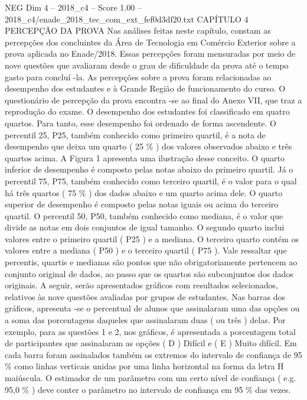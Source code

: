 \begin{textsample}{NEG Dim 4 – 2018\_c4 – Score 1.00 – 2018\_c4/enade\_2018\_tec\_com\_ext\_fef0d3df20.txt}  \label{ex:f4_neg_176}
CAPÍTULO 4 PERCEPÇÃO DA PROVA Nas análises feitas neste capítulo, constam as percepções dos concluintes da Área de Tecnologia em Comércio Exterior sobre a prova aplicada no Enade/2018.
Essas percepções foram mensuradas por meio de nove questões que avaliaram desde o grau de dificuldade da prova até o tempo gasto para concluí -la.
As percepções sobre a prova foram relacionadas ao desempenho dos estudantes e à Grande Região de funcionamento do curso.
O questionário de percepção da prova encontra -se ao final do Anexo VII, que traz a reprodução do exame.
O desempenho dos estudantes foi classificado em quatro quartos.
Para tanto, esse desempenho foi ordenado de forma ascendente.
O percentil 25, P25, também conhecido como primeiro quartil, é a nota de desempenho que deixa um quarto ( 25 \% ) dos valores observados abaixo e três quartos acima.
A Figura 1 apresenta uma ilustração desse conceito.
O quarto inferior de desempenho é composto pelas notas abaixo do primeiro quartil.
Já o percentil 75, P75, também conhecido como terceiro quartil, é o valor para o qual há três quartos ( 75 \% ) dos dados abaixo e um quarto acima dele.
O quarto superior de desempenho é composto pelas notas iguais ou acima do terceiro quartil.
O percentil 50, P50, também conhecido como mediana, é o valor que divide as notas em dois conjuntos de igual tamanho.
O segundo quarto inclui valores entre o primeiro quartil ( P25 ) e a mediana.
O terceiro quarto contém os valores entre a mediana ( P50 ) e o terceiro quartil ( P75 ).
Vale ressaltar que percentis, quartis e medianas são pontos que não obrigatoriamente pertencem ao conjunto original de dados, ao passo que os quartos são subconjuntos dos dados originais.
A seguir, serão apresentados gráficos com resultados selecionados, relativos às nove questões avaliadas por grupos de estudantes.
Nas barras dos gráficos, apresenta -se o percentual de alunos que assinalaram uma das opções ou a soma das porcentagens daqueles que assinalaram duas ( ou três ) delas.
Por exemplo, para as questões 1 e 2, nos gráficos, é apresentada a porcentagem total de participantes que assinalaram as opções ( D ) Difícil e ( E ) Muito difícil.
Em cada barra foram assinalados também os extremos do intervalo de confiança de 95 \% como linhas verticais unidas por uma linha horizontal na forma da letra H maiúscula.
O estimador de um parâmetro com um certo nível de confiança ( e.g. 95,0 \% ) deve conter o parâmetro no intervalo de confiança em 95 \% das vezes.

\end{textsample}
